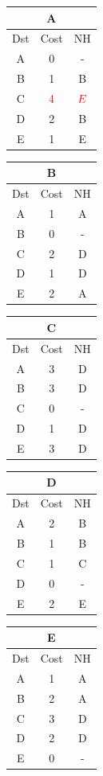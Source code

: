 \documentclass[10pt]{article}
\begin{document}
	\begin{table}[h!]
		\begin{tabular}{|c||c||c|}
 			\hline
	 		\multicolumn{3}{|c|}{A} \\
 			\hline
 			Dst & Cost & NH\\
 			\hline
 			A & 0 & - \\
 			B & 1 & B \\
 			C & $\color{red} 4$ & $\color{red} E$ \\
 			D & 2 & B \\
 			E & 1 & E \\
 			\hline
		\end{tabular}
		\begin{tabular}{|c||c||c|}
 			\hline
	 		\multicolumn{3}{|c|}{B} \\
 			\hline
 			Dst & Cost & NH\\
 			\hline
 			A & 1 & A \\
 			B & 0 & - \\
 			C & 2 & D \\
 			D & 1 & D \\
 			E & 2 & A \\
 			\hline
		\end{tabular}
		\begin{tabular}{|c||c||c|}
 			\hline
	 		\multicolumn{3}{|c|}{C} \\
 			\hline
 			Dst & Cost & NH\\
 			\hline
 			A & 3 & D \\
 			B &3 & D \\
 			C & 0 & - \\
 			D & 1 & D \\
 			E & 3 & D \\
 			\hline
		\end{tabular}
		\begin{tabular}{|c||c||c|}
 			\hline
	 		\multicolumn{3}{|c|}{D} \\
 			\hline
 			Dst & Cost & NH\\
 			\hline
 			A & 2 & B \\
 			B & 1 & B \\
 			C & 1 & C \\
 			D & 0 & - \\
 			E & 2 & E \\
 			\hline
		\end{tabular}
		\begin{tabular}{|c||c||c|}
 			\hline
	 		\multicolumn{3}{|c|}{E} \\
 			\hline
 			Dst & Cost & NH\\
 			\hline
 			A & 1 & A \\
 			B & 2 & A \\
 			C & 3 & D \\
 			D & 2 & D \\
 			E & 0 & - \\
 			\hline
		\end{tabular}
	\end{table}
\end{document}

